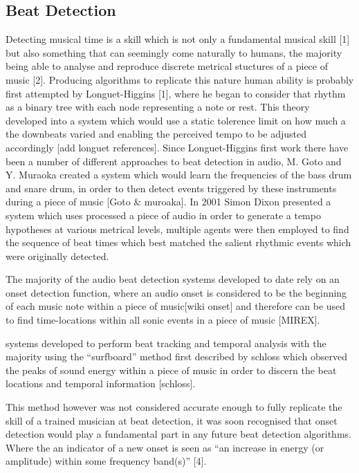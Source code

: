 \documentclass[a4paper, 11pt]{article}
\begin{document}
\subsection{Beat Detection}

Detecting musical time is a skill which is not only a fundamental musical skill [1] but also something that can seemingly come naturally to humans, the majority being able to analyse and reproduce discrete metrical stuctures of a piece of music [2]. Producing algorithms to replicate this nature human ability is probably first attempted by Longuet-Higgins [1], where he began to consider that rhythm as a binary tree with each node representing a note or rest. This theory developed into a system which would use a static tolerence limit on how much a the downbeats varied and enabling the perceived tempo to be adjusted accordingly [add longuet references]. Since Longuet-Higgins first work there have been a number of different approaches to beat detection in audio, M. Goto and Y. Muraoka created a system which would learn the frequencies of the bass drum and snare drum, in order to then detect events triggered by these instruments during a piece of music [Goto \& muroaka]. In 2001 Simon Dixon presented a system which uses processed a piece of audio in order to generate a tempo hypotheses at various metrical levels, multiple agents were then employed to find the sequence of beat times which best matched the salient rhythmic events which were originally detected.

The majority of the audio beat detection systems developed to date rely on an onset detection function, where an audio onset is considered to be the beginning of each music note within a piece of music[wiki onset] and therefore can be used to find time-locations within all sonic events in a piece of music [MIREX]. 



systems developed to perform beat tracking and temporal analysis with the majority using the ``surfboard'' method first described by schloss which observed the peaks of sound energy within a piece of music in order to discern the beat locations and temporal information [schloss]. 

This method however was not considered accurate enough to fully replicate the skill of a trained musician at beat detection, it was soon recognised that onset detection would play a fundamental part in any future beat detection algorithms. Where the an indicator of a new onset is seen as ``an increase in energy (or amplitude) within some frequency band(s)'' [4].
\end{document}
